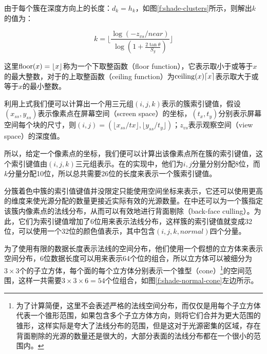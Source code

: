 \noindent 由于每个簇在深度方向上的长度：$d_k=h_k$，如图\ref{f:shade-clusters}所示，则解出$k$的值为：

\begin{equation}
	k=\Bigg\lfloor \frac{\log{(-z_{vs}/near)}}{\log{(1+\frac{2\tan{\theta}}{S_y})}} \Bigg\rfloor
\end{equation}

\noindent 这里${\rm floor}(x)=\lfloor x\rfloor$称为一个下取整函数（floor function），它表示取小于或等于$x$的最大整数，对于的上取整函数（ceiling function）为${\rm ceiling}(x)\lceil x\rceil$表示取大于或等于$x$的最小整数。

利用上式我们便可以计算出一个用三元组$(i,j,k)$表示的簇索引键值，假设$(x_{ss},y_{ss})$表示像素点在屏幕空间（screen space）的坐标，$(t_x,t_y)$分别表示屏幕空间每个块的尺寸，则$(i,j)=(\lfloor x_{ss}/tx\rfloor,\lfloor y_{ss}/t_y\rfloor)$；$z_{vs}$表示观察空间（view space）的深度值。

所以，给定一个像素点的坐标，我们便可以计算出该像素点所在簇的索引键值，这个索引键值由$(i,j,k)$三元组表示。在\cite{a:ClusteredDeferredandForwardShading}的实现中，他们为$i,j$分量分别分配8位，而$k$分量分配10位，所以总共需要26位的长度来表示一个簇索引键值。

分簇着色中簇的索引值键值并没限定只能使用空间坐标来表示，它还可以使用更高的维度来使光源分配的数量更接近实际有效的光源数量。在\cite{a:ClusteredDeferredandForwardShading}中还可以为一个簇指定该簇内像素点的法线分布，从而可以有效地进行背面剔除（back-face culling）。为此，它们为索引键值增加了6位用来表示法线分布，这样簇的索引键值就变成32位，可以使用一个32位的颜色值表示，其中包含$(i,j,k,normal)$四个分量。

为了使用有限的数据长度表示法线的空间分布，他们使用一个假想的立方体来表示空间分布，6位数据长度可以用来表示64个位的组合，所以立方体可以被细分为$3\times 3$个的子立方体，每个面的每个立方体分别表示一个锥型（cone）\footnote{为了计算简便，这里不会表述严格的法线空间分布，而仅仅是用每个子立方体代表一个锥形范围，如果包含多个子立方体方向，则将它们合并为更大范围的锥形，这样实际是夸大了法线分布的范围，但是这对于光源密集的区域，存在背面剔除的光源的数量还是很大的，大部分表面的法线分布都在一个很小的范围内。}的空间范围，这样一共需要$3\times 3\times 6=54$个位组合，如图\ref{f:shade-normal-cone}左边所示。

